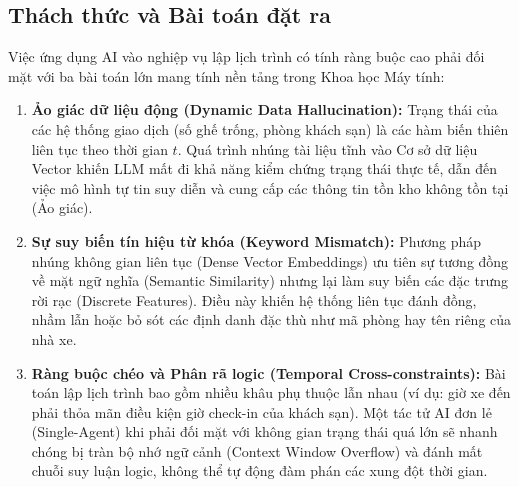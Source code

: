 \subsection{Thách thức và Bài toán đặt ra}

Việc ứng dụng AI vào nghiệp vụ lập lịch trình có tính ràng buộc cao phải đối mặt với ba bài toán lớn mang tính nền tảng trong Khoa học Máy tính:

\begin{enumerate}
    \item \textbf{Ảo giác dữ liệu động (Dynamic Data Hallucination):} Trạng thái của các hệ thống giao dịch (số ghế trống, phòng khách sạn) là các hàm biến thiên liên tục theo thời gian $t$. Quá trình nhúng tài liệu tĩnh vào Cơ sở dữ liệu Vector khiến LLM mất đi khả năng kiểm chứng trạng thái thực tế, dẫn đến việc mô hình tự tin suy diễn và cung cấp các thông tin tồn kho không tồn tại (Ảo giác).
    \item \textbf{Sự suy biến tín hiệu từ khóa (Keyword Mismatch):} Phương pháp nhúng không gian liên tục (Dense Vector Embeddings) ưu tiên sự tương đồng về mặt ngữ nghĩa (Semantic Similarity) nhưng lại làm suy biến các đặc trưng rời rạc (Discrete Features). Điều này khiến hệ thống liên tục đánh đồng, nhầm lẫn hoặc bỏ sót các định danh đặc thù như mã phòng hay tên riêng của nhà xe.
    \item \textbf{Ràng buộc chéo và Phân rã logic (Temporal Cross-constraints):} Bài toán lập lịch trình bao gồm nhiều khâu phụ thuộc lẫn nhau (ví dụ: giờ xe đến phải thỏa mãn điều kiện giờ check-in của khách sạn). Một tác tử AI đơn lẻ (Single-Agent) khi phải đối mặt với không gian trạng thái quá lớn sẽ nhanh chóng bị tràn bộ nhớ ngữ cảnh (Context Window Overflow) và đánh mất chuỗi suy luận logic, không thể tự động đàm phán các xung đột thời gian.
\end{enumerate}
